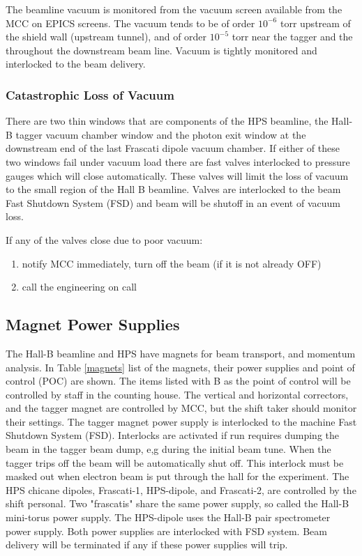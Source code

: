 \documentclass[12pt]{article}
\begin{document}
The beamline vacuum is monitored from the vacuum screen available from the MCC on EPICS screens. The vacuum tends to be of order \( 10^{-6} \) torr upstream of the shield wall (upstream tunnel), and of order \( 10^{-5} \) torr
near the tagger and the throughout the downstream beam line. Vacuum is tightly monitored and interlocked to the beam delivery. 


\subsubsection{Catastrophic Loss of Vacuum}

There are two thin windows that are components of the HPS beamline, the Hall-B tagger vacuum chamber window
and the photon exit window at the downstream end of the last Frascati dipole vacuum chamber. If either of these two windows fail under vacuum
load there are fast valves interlocked to pressure gauges which will close
automatically. These valves will limit the loss of vacuum to the small region  of the Hall B beamline. Valves are interlocked to the beam Fast Shutdown System (FSD) and beam will be shutoff in an event of vacuum loss.

If any of the valves close due to poor vacuum: 

\begin{enumerate}
\item notify MCC immediately, turn off the beam (if it is not already OFF)
\item call the engineering on call 
\end{enumerate}

\subsection{Magnet Power Supplies}

The Hall-B beamline and HPS have magnets for beam transport, and momentum analysis. In Table \ref{magnets} list of the magnets, their power supplies
and point of control (POC) are shown. The items listed with B
as the point of control will be controlled by staff in the counting
house. The vertical and horizontal correctors, and the tagger magnet are controlled
by MCC, but the shift taker should monitor their settings. The tagger
magnet power supply is interlocked to the machine Fast Shutdown System (FSD). Interlocks are activated if run requires dumping the beam in the tagger beam dump, e,g during the initial beam tune. When the tagger
trips off the beam will be automatically shut off. This interlock must 
be masked out when electron beam is put through the hall for the experiment. The HPS chicane dipoles, Frascati-1, HPS-dipole, and Frascati-2, are controlled by the shift personal. Two "frascatis" share the same power supply, so called the Hall-B mini-torus power supply. The HPS-dipole uses the Hall-B pair spectrometer power supply. Both power supplies are interlocked with FSD system. Beam delivery will be terminated if any if these power supplies will trip.
\end{document}
